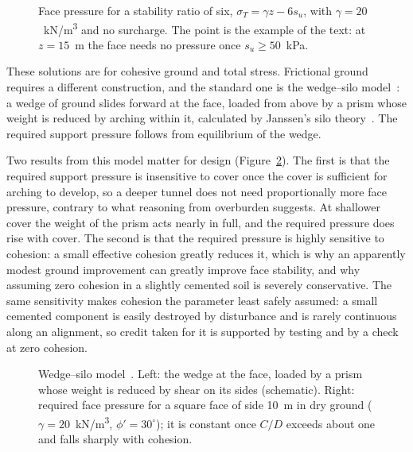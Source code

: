 \begin{figure}[htbp]
\centering
{}
\caption{Face pressure for a stability ratio of six, $\sigma_T = \gamma z - 6 s_u$, with $\gamma = 20$~kN/m\textsuperscript{3} and no surcharge. The point is the example of the text: at $z = 15$~m the face needs no pressure once $s_u \ge 50$~kPa.}
\label{fig:stability-ratio-pressure}
\end{figure}

These solutions are for cohesive ground and total stress. Frictional ground
requires a different construction, and the standard one is the wedge--silo
model~\citep{anagnostou1996face}: a wedge of ground slides forward at the face, loaded from above by a
prism whose weight is reduced by arching within it, calculated by Janssen's
silo theory~\citep{janssen1895versuche}. The required support pressure follows from equilibrium of the
wedge.

Two results from this model matter for design
(Figure~\ref{fig:wedge-silo}). The first is that the required support pressure
is insensitive to cover once the cover is sufficient for arching to develop,
so a deeper tunnel does not need proportionally more face pressure,
contrary to what reasoning from overburden suggests. At shallower cover
the weight of the prism acts nearly in full, and the required pressure does
rise with cover. The second is that the required pressure is highly sensitive to
cohesion: a small effective cohesion greatly reduces it,
which is why an apparently modest ground improvement can greatly improve face
stability, and why assuming zero cohesion in a slightly cemented soil is
severely conservative. The same sensitivity makes cohesion the parameter
least safely assumed: a small cemented component is easily destroyed by
disturbance and is rarely continuous along an alignment, so credit taken for
it is supported by testing and by a check at zero cohesion.

\begin{figure}[htbp]
\centering
{}
\caption{Wedge--silo model~\citep{anagnostou1996face}. Left: the wedge at the face, loaded by a prism whose weight is reduced by shear on its sides (schematic). Right: required face pressure for a square face of side 10~m in dry ground ($\gamma = 20$~kN/m\textsuperscript{3}, $\phi' = 30^\circ$); it is constant once $C/D$ exceeds about one and falls sharply with cohesion.}
\label{fig:wedge-silo}
\end{figure}

